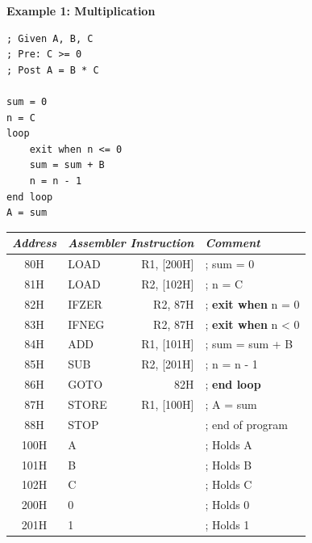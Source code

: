 \documentclass[twocolumn,english]{article}
\providecommand{\tabularnewline}{\\}
\begin{document}
\begin{table}[H]
\textbf{Example 1: Multiplication\smallskip{}
}

\noindent \begin{minipage}[b]{0.15\textwidth}
\begin{lstlisting}[basicstyle={\scriptsize},breaklines=true,keywords={loop, exit, when, end}]
; Given A, B, C
; Pre: C >= 0
; Post A = B * C

sum = 0
n = C
loop
    exit when n <= 0
    sum = sum + B
    n = n - 1
end loop
A = sum
\end{lstlisting}


\noindent \end{minipage}
\begin{minipage}[b]{0.35\textwidth}%
\begin{tabular}{clrl}
\toprule 
\emph{\footnotesize{}Address} & \multicolumn{2}{c}{\emph{\footnotesize{}Assembler Instruction}} & \emph{\footnotesize{}Comment}\tabularnewline
\midrule
{\footnotesize{}80H} & {\footnotesize{}LOAD} & {\footnotesize{}R1, {[}200H{]}} & {\footnotesize{}; sum = 0}\tabularnewline
{\footnotesize{}81H} & {\footnotesize{}LOAD} & {\footnotesize{}R2, {[}102H{]}} & {\footnotesize{}; n = C}\tabularnewline
{\footnotesize{}82H} & {\footnotesize{}IFZER } & {\footnotesize{}R2, 87H} & {\footnotesize{}; }\textbf{\footnotesize{}exit when}{\footnotesize{}
n = 0}\tabularnewline
{\footnotesize{}83H} & {\footnotesize{}IFNEG} & {\footnotesize{}R2, 87H} & {\footnotesize{}; }\textbf{\footnotesize{}exit when}{\footnotesize{}
n \textless{} 0}\tabularnewline
{\footnotesize{}84H} & {\footnotesize{}ADD} & {\footnotesize{}R1, {[}101H{]}} & {\footnotesize{}; sum = sum + B}\tabularnewline
{\footnotesize{}85H} & {\footnotesize{}SUB} & {\footnotesize{}R2, {[}201H{]}} & {\footnotesize{}; n = n - 1}\tabularnewline
{\footnotesize{}86H} & {\footnotesize{}GOTO} & {\footnotesize{}82H} & {\footnotesize{}; }\textbf{\footnotesize{}end loop}\tabularnewline
{\footnotesize{}87H} & {\footnotesize{}STORE} & {\footnotesize{}R1, {[}100H{]}} & {\footnotesize{}; A = sum}\tabularnewline
{\footnotesize{}88H} & {\footnotesize{}STOP} &  & {\footnotesize{}; end of program}\tabularnewline
\midrule
{\footnotesize{}100H} & {\footnotesize{}A} &  & {\footnotesize{}; Holds A}\tabularnewline
{\footnotesize{}101H} & {\footnotesize{}B} &  & {\footnotesize{}; Holds B}\tabularnewline
{\footnotesize{}102H} & {\footnotesize{}C} &  & {\footnotesize{}; Holds C}\tabularnewline
\midrule
{\footnotesize{}200H} & {\footnotesize{}0} &  & {\footnotesize{}; Holds 0}\tabularnewline
{\footnotesize{}201H} & {\footnotesize{}1} &  & {\footnotesize{}; Holds 1}\tabularnewline
\bottomrule
\end{tabular}

\noindent \centering{}\end{minipage}
\end{table}
\end{document}
